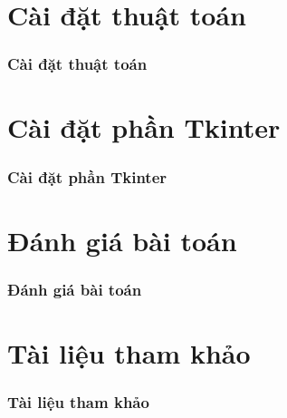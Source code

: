 \documentclass[10.5pt]{beamer}
\begin{document}
\section{Cài đặt thuật toán}
\begin{frame}
	\frametitle{\fontsize{11.5pt}{12.5pt}\selectfont Cài đặt thuật toán}
\end{frame}

\section{Cài đặt phần Tkinter}
\begin{frame}
	\frametitle{\fontsize{11.5pt}{12.5pt}\selectfont Cài đặt phần Tkinter}
\end{frame}

\section{Đánh giá bài toán}
\begin{frame}
	\frametitle{\fontsize{11.5pt}{12.5pt}\selectfont Đánh giá bài toán}
\end{frame}
\section{Tài liệu tham khảo}
\begin{frame}
	\frametitle{\fontsize{11.5pt}{12.5pt}\selectfont Tài liệu tham khảo}
\end{frame}
\end{document}
